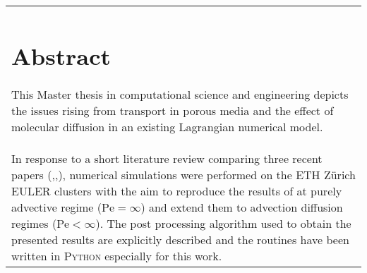 \begin{tabular}{p{}}
\chapter*{Abstract}

This Master thesis in computational science and engineering depicts the issues rising from transport in porous media and the effect of molecular diffusion in an existing Lagrangian numerical model. \\
In response to a short literature review comparing three recent papers (\citet{Puyguiraud2019},\citet{Dentz2017},\citet{Meyer2016}), numerical simulations were performed on the ETH Zürich EULER clusters with the aim to reproduce the results of \citet{Meyer2016} at purely advective regime ($\mathrm{Pe}=\infty$) and extend them to advection diffusion regimes ($\mathrm{Pe}<\infty$).
The post processing algorithm used to obtain the presented results are explicitly described and the routines have been written in \textsc{Python} especially for this work.\\
\end{tabular}
